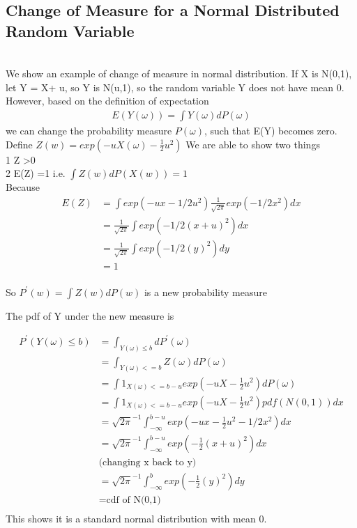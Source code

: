 \documentclass[a4paper]{article}
\begin{document}
\subsection{Change of Measure for a Normal Distributed Random Variable}\\
We show an example of change of measure in normal distribution. If X is N(0,1), let Y = X+ u, so Y is N(u,1), so the random variable Y does not have mean 0. However, based
on the definition of expectation\\
\begin{align*}
	E(Y(\omega)) = \int Y(\omega) dP(\omega)
\end{align*}
we can change the probability measure $P(\omega)$, such that E(Y) becomes zero.
Define $Z(w) = exp(-uX(\omega) - \frac{1}{2}u^2)$
We are able to show two things\\ 
1 Z \textgreater 0 \\
2 E(Z) =1 i.e. $\int Z(w)dP(X(w)) = 1$ \\
Because 
\begin{align*}
E(Z)  & = \int exp(-ux-1/2u^2) \frac{1}{\sqrt{2\pi}} exp(-1/2x^2) dx\\
& = \frac{1}{\sqrt{2\pi}}  \int exp(-1/2(x+u)^2) dx \\
& = \frac{1}{\sqrt{2\pi}}  \int exp(-1/2(y)^2) dy \\
& = 1 \\
\end{align*}

So $P^{'}(w) = \int Z(w) dP(w)$ is a new probability measure

The pdf of Y under the new measure is

\begin{align*}
	P^{'}(Y(\omega) \leq b) & = \int_{Y(\omega) \leq b} d P^{'}(\omega) \\
&= \int_{Y(\omega)<=b} Z(\omega) dP(\omega) \\
&= \int 1_{X(\omega)<=b-u} exp(-uX- \frac{1}{2} u^2 )dP(\omega) \\
&=\int 1_{X(\omega)<=b-u} exp(-uX- \frac{1}{2} u^2 ) pdf(N(0,1)) dx \\
&=  {\sqrt{2\pi}}^{-1} \int_{-\infty}^{b-u} exp(-ux -\frac{1}{2}u^2 -1/2x^2) dx \\
&=  {\sqrt{2\pi}}^{-1}\int_{-\infty}^{b-u} exp(-\frac{1}{2} (x+u)^2) dx \\
&\textrm{(changing x back to y)}\\
&=  {\sqrt{2\pi}}^{-1}\int _{-\infty}^{b} exp(-\frac{1}{2} (y)^2) dy \\
&= \textrm{cdf of N(0,1)} \\
\end{align*}
This shows it is a standard normal distribution with mean 0.\\
\end{document}
